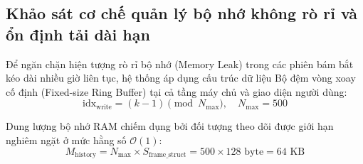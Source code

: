 \begin{table}[H]
\centering
\caption{Đo đạc độ chính xác đồng bộ thời gian giữa các kênh cảm biến ngoại vi}
\label{tab:sensor-timestamp-synchronization}
\end{table}

\subsection{Khảo sát cơ chế quản lý bộ nhớ không rò rỉ và ổn định tải dài hạn}

\hspace{0.5cm} Để ngăn chặn hiện tượng rò rỉ bộ nhớ (Memory Leak) trong các phiên bám bắt kéo dài nhiều giờ liên tục, hệ thống áp dụng cấu trúc dữ liệu Bộ đệm vòng xoay cố định (Fixed-size Ring Buffer) tại cả tầng máy chủ và giao diện người dùng:
\begin{equation}
\text{idx}_{\text{write}} = (k - 1) \pmod{N_{\text{max}}}, \quad N_{\text{max}} = 500
\label{eq:ring-buffer-modulo-formula}
\end{equation}

Dung lượng bộ nhớ RAM chiếm dụng bởi đối tượng theo dõi được giới hạn nghiêm ngặt ở mức hằng số $\mathcal{O}(1)$:
\begin{equation}
M_{\text{history}} = N_{\text{max}} \times S_{\text{frame\_struct}} = 500 \times 128\text{ byte} = 64\text{ KB}
\label{eq:fixed-memory-footprint-formula}
\end{equation}

